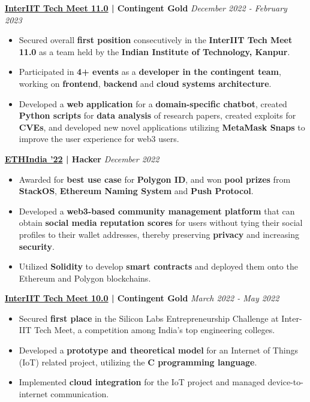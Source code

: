 \documentclass[10pt,a4paper]{extarticle}
\begin{document}
\begin{center}
    \textbf{\href{https://interiit-tech.org/}{InterIIT Tech Meet 11.0} | Contingent Gold}
    \hfill\hfill\textit{December 2022 - February 2023}
\end{center}
\begin{itemize}
    \item Secured overall \textbf{first position} consecutively in the \textbf{InterIIT Tech Meet 11.0} as a team held by the \textbf{Indian Institute of Technology, Kanpur}.
    \item Participated in \textbf{4+ events} as a \textbf{developer in the contingent team}, working on \textbf{frontend}, \textbf{backend} and \textbf{cloud systems architecture}.
    \item Developed a \textbf{web application} for a \textbf{domain-specific chatbot}, created \textbf{Python scripts} for \textbf{data analysis} of research papers, created exploits for \textbf{CVEs}, and developed new novel applications utilizing \textbf{MetaMask Snaps} to improve the user experience for web3 users.
\end{itemize}
\vspace{2.5mm}

\begin{center}
    \textbf{\href{https://ethindia.co/}{ETHIndia '22} | Hacker}
    \hfill\hfill\textit{December 2022}
\end{center}
\begin{itemize}
    \item Awarded for \textbf{best use case} for \textbf{Polygon ID}, and won \textbf{pool prizes} from \textbf{StackOS}, \textbf{Ethereum Naming System} and \textbf{Push Protocol}.
    \item Developed a \textbf{web3-based community management platform} that can obtain \textbf{social media reputation scores} for users without tying their social profiles to their wallet addresses, thereby preserving \textbf{privacy} and increasing \textbf{security}.
    \item Utilized \textbf{Solidity} to develop \textbf{smart contracts} and deployed them onto the Ethereum and Polygon blockchains.
\end{itemize}
\vspace{2.5mm}

\begin{center}
    \textbf{\href{https://interiit-tech.org/}{InterIIT Tech Meet 10.0} | Contingent Gold}
    \hfill\hfill\textit{March 2022 - May 2022}
\end{center}
\begin{itemize}
    \item Secured \textbf{first place} in the Silicon Labs Entrepreneurship Challenge at Inter-IIT Tech Meet, a competition among India's top engineering colleges.
    \item Developed a \textbf{prototype and theoretical model} for an Internet of Things (IoT) related project, utilizing the \textbf{C programming language}.
    \item Implemented \textbf{cloud integration} for the IoT project and managed device-to-internet communication.
\end{itemize}
\vspace{2.5mm}
\end{document}
